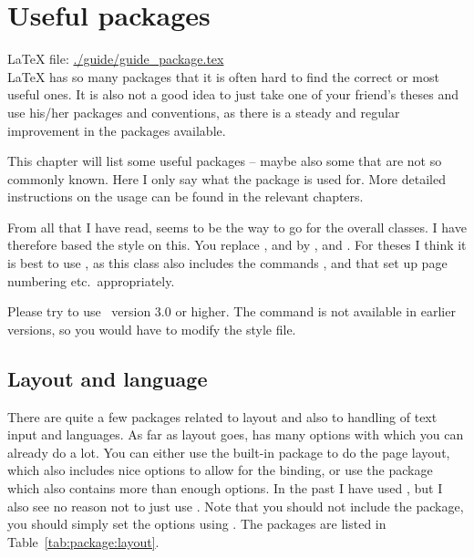 \chapter{Useful packages}
\label{sec:package}

\LaTeX{} file: \url{./guide/guide_package.tex}\\[1ex]
\noindent
\LaTeX{} has so many packages that it is often hard to find the
correct or most useful ones. It is also not a good idea to just take
one of your friend's theses and use his/her packages and conventions,
as there is a steady and regular improvement in the packages
available.

This chapter will list some useful packages -- maybe also some that
are not so commonly known. Here I only say what the package is used
for. More detailed instructions on the usage can be found in the
relevant chapters.

From all that I have read, \KOMAScript{}
seems to be the way to go for the overall classes. I have therefore
based the  style on this. You replace
,  and  by
,  and . For
theses I think it is best to use , as this class also
includes the commands ,  and
 that set up page numbering etc.\ appropriately.

Please try to use \KOMAScript\ version 3.0 or higher. The
 command is not available in earlier versions, so
you would have to modify the style file.


\section{Layout and language}
\label{sec:package:layout}

There are quite a few packages related to layout and also to handling
of text input and languages. As far as layout goes, \KOMAScript{} has
many options with which you can already do a lot. You can either use
the built-in  package to do the page layout, which
also includes nice options to allow for the binding, or use the
 package which also contains more than enough
options. In the past I have used , but I also see no
reason not to just use . Note that you should not
include the  package, you should simply set the
options using .
The packages are listed in Table~\ref{tab:package:layout}.


